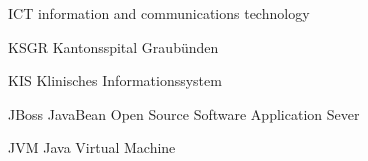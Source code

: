 
\begin{abkuerzungen}[MUSTER] %
    \item[ICT] information and communications technology
    \item[KSGR] Kantonsspital Graubünden
    \item[KIS] Klinisches Informationssystem
    \item[\gls{JBoss}] JavaBean Open Source Software Application Sever
    \item{JVM} \Gls{Java} Virtual Machine
\end{abkuerzungen}